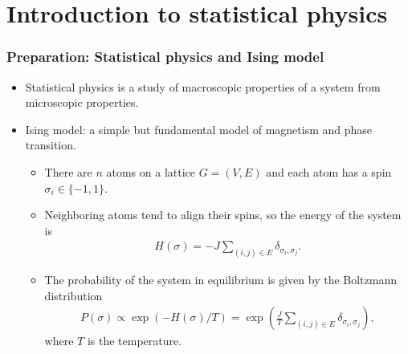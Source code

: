 \documentclass[dvipdfmx,11pt]{beamer}
\begin{document}
\section{Introduction to statistical physics}

\begin{frame}
  \frametitle{Preparation: Statistical physics and Ising model}
  \begin{itemize}
    \item Statistical physics is a study of macroscopic properties of a system from microscopic properties.
    \item \alert{Ising model}: a simple but fundamental model of magnetism and phase transition.
    \begin{itemize}
      \item There are $n$ atoms on a lattice $G = (V, E)$ and each atom has a spin $\sigma_i \in \{-1, 1\}$.
      \item Neighboring atoms tend to align their spins, so the energy of the system is
      \begin{align*}
        H(\sigma) = - J \sum_{(i, j) \in E}  \delta_{\sigma_i, \sigma_j}.
      \end{align*}
      \item The probability of the system in equilibrium is given by the Boltzmann distribution
      \begin{align*}
        P(\sigma) \propto \exp(- H(\sigma) / T) = \exp( \frac{J}{T} \sum_{(i, j) \in E}  \delta_{\sigma_i, \sigma_j}),
      \end{align*}
      where $T$ is the temperature.
    \end{itemize}
  \end{itemize}
\end{frame}
\end{document}
